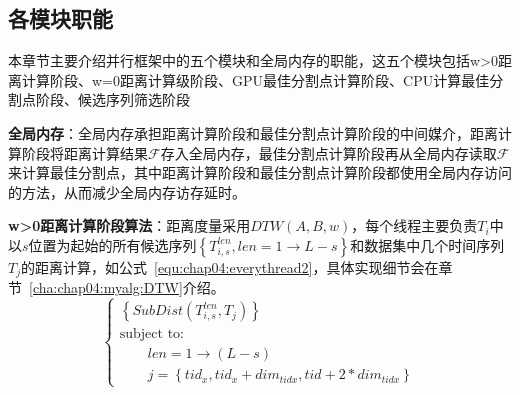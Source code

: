 \subsection{各模块职能}
\label{cha:chap03:modelduty}
%
本章节主要介绍并行框架中的五个模块和全局内存的职能，这五个模块包括w>0距离计算阶段、w=0距离计算级阶段、GPU最佳分割点计算阶段、CPU计算最佳分割点阶段、候选序列筛选阶段


\textbf{全局内存}：全局内存承担距离计算阶段和最佳分割点计算阶段的中间媒介，距离计算阶段将距离计算结果$\mathcal{F}$存入全局内存，最佳分割点计算阶段再从全局内存读取$\mathcal{F}$来计算最佳分割点，其中距离计算阶段和最佳分割点计算阶段都使用全局内存访问的方法，从而减少全局内存访存延时。

\textbf{w>0距离计算阶段算法}：距离度量采用$DTW(A,B,w)$，每个线程主要负责$T_i$中以$s$位置为起始的所有候选序列$\left\lbrace T_{i,s}^{len},len=1\to L-s\right\rbrace $和数据集中几个时间序列$T_j$的距离计算，如公式~\ref{equ:chap04:everythread2}，具体实现细节会在章节~\ref{cha:chap04:myalg:DTW}介绍。
\begin{equation}\label{equ:chap04:everythread2}
\left\{\begin{array}{l}
\left\lbrace SubDist(T_{i,s}^{len},T_j) \right\rbrace \\[0.1cm]
\mbox{subject to:}\\[0.1cm]
\qquad len=1\to (L-s)\\[0.1cm]
\qquad j=\left\lbrace tid_x,tid_x+dim_{tidx},tid+2*dim_{tidx}\right\rbrace 
\end{array}\right.
\end{equation}

